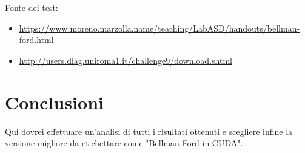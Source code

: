 \documentclass[a4paper]{article}
\begin{document}
	
	
	Fonte dei test:
	\begin{itemize}
		\item \url{https://www.moreno.marzolla.name/teaching/LabASD/handouts/bellman-ford.html}
		\item \url{http://users.diag.uniroma1.it/challenge9/download.shtml}
	\end{itemize}
	
	\section{Conclusioni}
	\label{section:end}
	Qui dovrei effettuare un'analisi di tutti i risultati ottenuti e scegliere infine la versione migliore da etichettare come "Bellman-Ford in CUDA".
	
	\printbibliography
	
\end{document}
